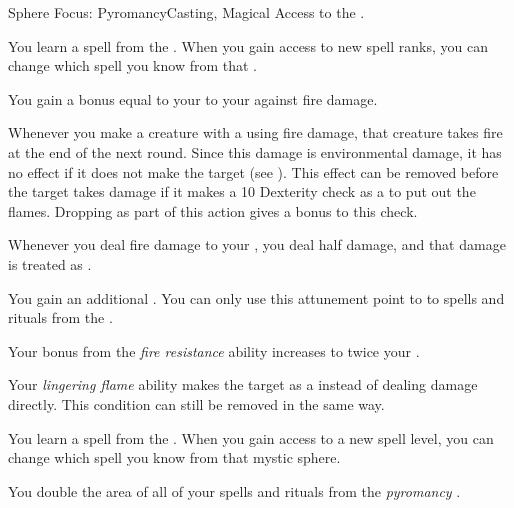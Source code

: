     \begin{feat}{Sphere Focus: Pyromancy}{Casting, Magical}
        \featpre Access to the  .

         You learn a spell from the  .
        When you gain access to new spell ranks, you can change which spell you know from that .

         You gain a bonus equal to your  to your  against fire damage.

         Whenever you make a creature  with a  using fire damage, that creature takes  fire  at the end of the next round.
        Since this damage is environmental damage, it has no effect if it does not make the target  (see ).
        This effect can be removed before the target takes damage if it makes a  10 Dexterity check as a  to put out the flames.
        Dropping  as part of this action gives a  bonus to this check.

         Whenever you deal fire damage to your , you deal half damage, and that damage is treated as .

         You gain an additional .
        You can only use this attunement point to  to spells and rituals from the  .

         Your bonus from the \textit{fire resistance} ability increases to twice your .

         Your \textit{lingering flame} ability makes the target  as a  instead of dealing damage directly.
        This condition can still be removed in the same way.

         You learn a spell from the  .
        When you gain access to a new spell level, you can change which spell you know from that mystic sphere.

         You double the area of all of your spells and rituals from the \textit{pyromancy} .
    \end{feat}

